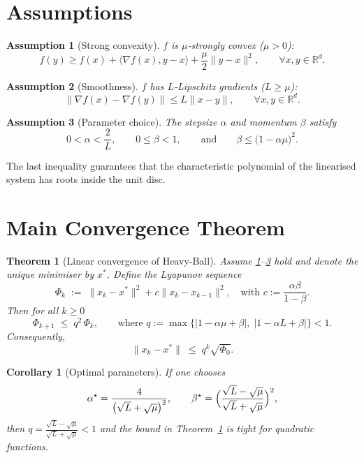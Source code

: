 \documentclass[11pt]{article}
\newtheorem{theorem}{Theorem}
\newtheorem{assumption}{Assumption}
\newtheorem{corollary}{Corollary}
\newcommand{\R}{\mathbb{R}}
\begin{document}
\newpage

\section*{Assumptions}
\begin{assumption}[Strong convexity]\label{ass:strong}
$f$ is $\mu$‑strongly convex ($\mu>0$):
\[
f(y)\ge f(x)+\langle\nabla f(x),y-x\rangle+\frac{\mu}{2}\|y-x\|^{2},
\qquad\forall x,y\in\R^{d}.
\]
\end{assumption}
\begin{assumption}[Smoothness]\label{ass:smooth}
$f$ has $L$‑Lipschitz gradients ($L\ge\mu$):
\[
\|\nabla f(x)-\nabla f(y)\|\le L\|x-y\|,\qquad\forall x,y\in\R^{d}.
\]
\end{assumption}
\begin{assumption}[Parameter choice]\label{ass:param}
The stepsize $\alpha$ and momentum $\beta$ satisfy
\[
0<\alpha<\frac{2}{L},\qquad
0\le\beta<1,\qquad
\text{and}\qquad
\beta\le\bigl(1-\alpha\mu\bigr)^{2}.
\]
\end{assumption}
The last inequality guarantees that the characteristic polynomial of the linearised system has roots inside the unit disc.

\section*{Main Convergence Theorem}
\begin{theorem}[Linear convergence of Heavy‑Ball]\label{thm:hb}
Assume \ref{ass:strong}–\ref{ass:param} hold and denote the unique minimiser by $x^{*}$.  
Define the Lyapunov sequence
\[
\Phi_{k}\;:=\;\|x_{k}-x^{*}\|^{2}+c\|x_{k}-x_{k-1}\|^{2},
\quad\text{with }c:=\frac{\alpha\beta}{1-\beta}.
\]
Then for all $k\ge 0$
\[
\Phi_{k+1}\;\le\;q^{2}\,\Phi_{k},
\qquad\text{where }
q:=\max\bigl\{|1-\alpha\mu+\beta|,\;|1-\alpha L+\beta|\bigr\}<1 .
\]
Consequently,
\[
\|x_{k}-x^{*}\|\;\le\;q^{k}\sqrt{\Phi_{0}}.
\]
\end{theorem}
\begin{corollary}[Optimal parameters]\label{cor:opt}
If one chooses
\[
\alpha^{\star}= \frac{4}{\bigl(\sqrt{L}+\sqrt{\mu}\bigr)^{2}},\qquad
\beta^{\star}= \Bigl(\frac{\sqrt{L}-\sqrt{\mu}}{\sqrt{L}+\sqrt{\mu}}\Bigr)^{2},
\]
then $q=\frac{\sqrt{L}-\sqrt{\mu}}{\sqrt{L}+\sqrt{\mu}}<1$ and the bound in Theorem~\ref{thm:hb} is tight for quadratic functions.
\end{corollary}
\end{document}
